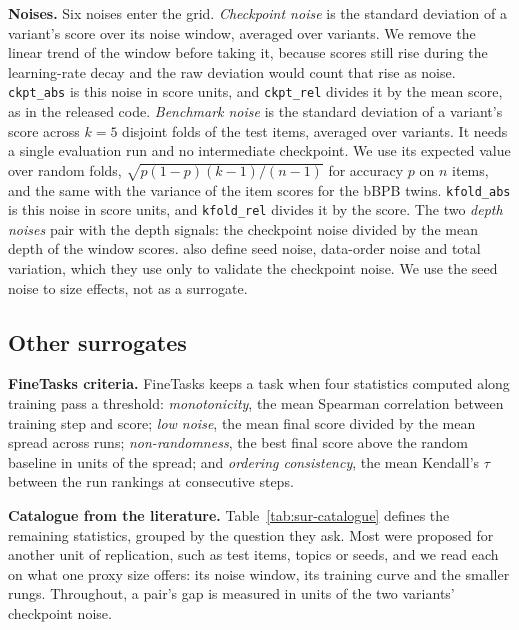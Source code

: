 \textbf{Noises.} Six noises enter the grid.
\emph{Checkpoint noise} is the standard deviation of a variant's score over its noise window, averaged over variants. We remove the linear trend of the window before taking it, because scores still rise during the learning-rate decay and the raw deviation would count that rise as noise. \texttt{ckpt\_abs} is this noise in score units, and \texttt{ckpt\_rel} divides it by the mean score, as in the released code.
\emph{Benchmark noise} is the standard deviation of a variant's score across $k = 5$ disjoint folds of the test items, averaged over variants. It needs a single evaluation run and no intermediate checkpoint. We use its expected value over random folds, $\sqrt{p(1-p)(k-1)/(n-1)}$ for accuracy $p$ on $n$ items, and the same with the variance of the item scores for the bBPB twins. \texttt{kfold\_abs} is this noise in score units, and \texttt{kfold\_rel} divides it by the score.
The two \emph{depth noises} pair with the depth signals: the checkpoint noise divided by the mean depth of the window scores.
\citet{heineman_signal_2025} also define seed noise, data-order noise and total variation, which they use only to validate the checkpoint noise. We use the seed noise to size effects, not as a surrogate.

\subsection{Other surrogates}
\label{app:sur-finetasks}
\label{app:sur-catalogue}

\textbf{FineTasks criteria.} FineTasks \citep{kydlicek_finetasks_nodate, penedo_fineweb2_2025} keeps a task when four statistics computed along training pass a threshold: \emph{monotonicity}, the mean Spearman correlation between training step and score; \emph{low noise}, the mean final score divided by the mean spread across runs; \emph{non-randomness}, the best final score above the random baseline in units of the spread; and \emph{ordering consistency}, the mean Kendall's $\tau$ between the run rankings at consecutive steps.

\textbf{Catalogue from the literature.} Table~\ref{tab:sur-catalogue} defines the remaining statistics, grouped by the question they ask. Most were proposed for another unit of replication, such as test items, topics or seeds, and we read each on what one proxy size offers: its noise window, its training curve and the smaller rungs. Throughout, a pair's gap is measured in units of the two variants' checkpoint noise.

